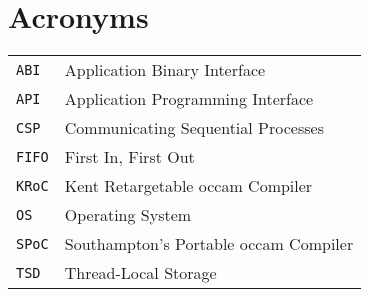 
\chapter{Acronyms}

\begin{table}[h!]
    \centering
    \begin{tabular}{ll}
        \texttt{ABI}  & Application Binary Interface \\
        \texttt{API}  & Application Programming Interface \\
        \texttt{CSP}  & Communicating Sequential Processes \\
        \texttt{FIFO} & First In, First Out \\
        \texttt{KRoC} & Kent Retargetable occam Compiler \\
        \texttt{OS}   & Operating System \\
        \texttt{SPoC} & Southampton's Portable occam Compiler \\
        \texttt{TSD}  & Thread-Local Storage
    \end{tabular}
\end{table}